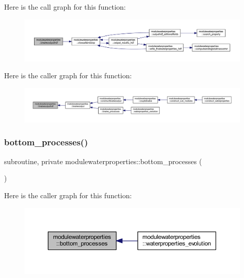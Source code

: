 Here is the call graph for this function\+:\nopagebreak
\begin{figure}[H]
\begin{center}
\leavevmode
\includegraphics[width=350pt]{namespacemodulewaterproperties_a6d9213c5f38db58c01899d8b68076950_cgraph}
\end{center}
\end{figure}
Here is the caller graph for this function\+:\nopagebreak
\begin{figure}[H]
\begin{center}
\leavevmode
\includegraphics[width=350pt]{namespacemodulewaterproperties_a6d9213c5f38db58c01899d8b68076950_icgraph}
\end{center}
\end{figure}
\mbox{\label{namespacemodulewaterproperties_aaba72b54a08a1561f8eff8fae60998f2}} 
\subsubsection{\texorpdfstring{bottom\+\_\+processes()}{bottom\_processes()}}
{\footnotesize\ttfamily subroutine, private modulewaterproperties\+::bottom\+\_\+processes (\begin{DoxyParamCaption}{ }\end{DoxyParamCaption})\hspace{0.3cm}{\ttfamily [private]}}

Here is the caller graph for this function\+:\nopagebreak
\begin{figure}[H]
\begin{center}
\leavevmode
\includegraphics[width=350pt]{namespacemodulewaterproperties_aaba72b54a08a1561f8eff8fae60998f2_icgraph}
\end{center}
\end{figure}
\mbox{\label{namespacemodulewaterproperties_a370617430ffb5b34448cfc27deca6c88}} 
